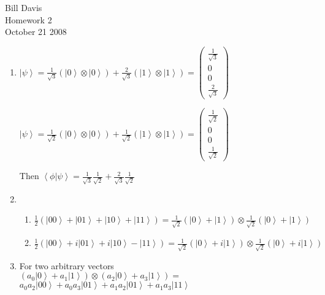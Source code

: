 \documentclass[11pt,fleqn]{article}
\begin{document}
\newcommand{\mbf}[1]{\mbox{{\bfseries #1}}}
\newcommand{\N}{\mbf{N}}
\renewcommand{\O}{\mbf{O}}
\newcommand{\ket}[1]{\left | #1 \right \rangle}
\newcommand{\bra}[1]{\left \langle #1 \right.|}
\newcommand{\braket}[2]{\left \langle #1 \right. \left | #2 \right \rangle}

\noindent Bill Davis \\
Homework 2 \\
October 21 2008

\begin{enumerate}
\item %
$ \ket{\psi} = \frac{1}{\sqrt{3}}(\ket{0} \otimes \ket{0}) + 
\frac{2}{\sqrt{3}}(\ket{1} \otimes \ket{1}) = 
\left(\begin{array}{c}
\frac{1}{\sqrt{3}} \\
0 \\
0 \\
\frac{2}{\sqrt{3}} 
\end{array}\right)$

	
$ \ket{\psi} = \frac{1}{\sqrt{2}}(\ket{0} \otimes \ket{0}) + 
\frac{1}{\sqrt{2}}(\ket{1} \otimes \ket{1}) = 
\left(\begin{array}{c}
\frac{1}{\sqrt{2}} \\
0 \\
0 \\
\frac{1}{\sqrt{2}} 
\end{array}\right)$

Then $\braket{\phi}{\psi} = \frac{1}{\sqrt{3}}\frac{1}{\sqrt{2}} + \frac{2}{\sqrt{3}}\frac{1}{\sqrt{2}}$ 

\item %
\begin{enumerate}
\item 

$\frac{1}{2}(\ket{00}+\ket{01} + \ket{10} + \ket{11}) = \frac{1}{\sqrt{2}}(\ket{0} + \ket{1}) \otimes \frac{1}{\sqrt{2}}(\ket{0} + \ket{1})$
\item
$\frac{1}{2}(\ket{00}+i\ket{01} + i\ket{10} - \ket{11}) = \frac{1}{\sqrt{2}}(\ket{0} + i\ket{1}) \otimes \frac{1}{\sqrt{2}}(\ket{0} + i\ket{1})$
\end{enumerate}

\item %
For two arbitrary vectors \\
 $(a_{0}\ket{0} + a_{1}\ket{1}) \otimes (a_{2}\ket{0} + a_{3}\ket{1}) =$\\
$ 
a_{0}a_{2}\ket{00} + a_{0}a_{3}\ket{01} + a_{1}a_{2}\ket{01} + a_{1}a_{3}\ket{11}$



\end{enumerate}
\end{document}
